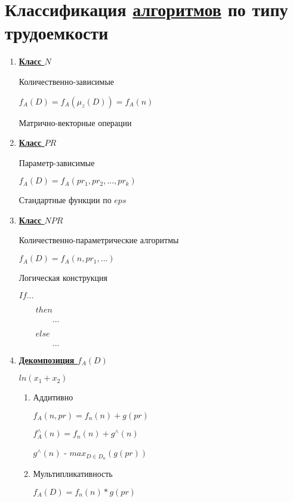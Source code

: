 \documentclass[12pt]{report}
\begin{document}
	\section*{Классификация \underline{алгоритмов} по типу трудоемкости}
	\begin{enumerate}
		\item \underline{\textbf{Класс $N$}}\par
		Количественно-зависимые\par
		$f_{A}(D)=f_{A}(\mu_{z}(D))=f_{A}(n)$\par\par
		Матрично-векторные операции\par
		\item \underline{\textbf{Класс $PR$}}\par
		Параметр-зависимые\par
		$f_{A}(D)=f_{A}(pr_{1},pr_{2},...,pr_{k})$\par\par
		Стандартные функции по $eps$\par
		\item \underline{\textbf{Класс $NPR$}}\par
		Количественно-параметрические алгоритмы\par
		$f_{A}(D)=f_{A}(n,pr_{1},...)$\par
		Логическая конструкция\par
		$If ...$\par
		$\qquad then$\par
		$\qquad\qquad ...$\par
		$\qquad else$\par
		$\qquad\qquad ...$\par
		\item \underline{\textbf{Декомпозиция $f_{A}(D)$}}\par
		$ln(x_{1}+x_{2})$\par
		\begin{enumerate}
			\item Аддитивно\par
			$f_{A}(n,pr)=f_{n}(n)+g(pr)$\par
			$f_{A}^{\wedge}(n)=f_{n}(n)+g^{\wedge}(n)$\par
			$g^{\wedge}(n)$ - $max_{D \in D_{n}}(g(pr))$\par
			\item Мультипликативность\par
			$f_{A}(D)=f_{n}(n)*g(pr)$\par

\end{enumerate}
\end{enumerate}
\end{document}
